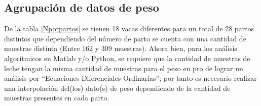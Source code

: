 \subsection{Agrupación de datos de peso}
De la tabla \ref{Nporpartos} se tienen 18 vacas diferentes para un total de 28 partos distintos que dependiendo del número de parto se cuenta con una cantidad de muestras distinta (Entre 162 y 309 muestras). Ahora bien, para los análisis algorítmicos en Matlab y/o Python, se requiere que la cantidad de muestras de leche tengan la misma cantidad de muestras para el peso en pro de lograr un análisis por ``Ecuaciones Diferenciales Ordinarias''; por tanto es necesario realizar una interpolación del(los) dato(s) de peso dependiendo de la cantidad de muestras presentes en cada parto.
